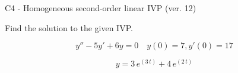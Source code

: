 \begin{exercise}
  \begin{exerciseTitle}C4 - Homogeneous second-order linear IVP (ver. 12)\end{exerciseTitle}
  \begin{exerciseStatement}
    
Find the solution to the given IVP.

    
\[y''-5y'+6y = 0 \hspace{1em} y(0) = 7 , y'(0) = 17\]

  \end{exerciseStatement}
  \begin{exerciseAnswer}
    
\[y= 3 \, e^{\left(3 \, t\right)} + 4 \, e^{\left(2 \, t\right)}\]

  \end{exerciseAnswer}
\end{exercise}